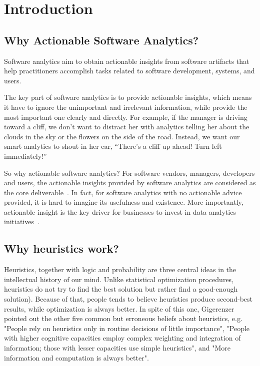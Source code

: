 \documentclass[table, xcdraw, sigconf,review, anonymous]{acmart}
\begin{document}
% 
\section{Introduction}

    \subsection{Why Actionable Software Analytics?}
        Software analytics aim to
        obtain actionable insights
        from software artifacts that
        help practitioners accomplish tasks 
        related to software development, systems, 
        and users.
        
        The key part of software analytics is to provide 
        actionable insights, which means it have to 
        ignore the unimportant and irrelevant information, 
        while provide the most important one clearly and directly.
        For example, if the manager is driving toward a cliff, 
        we don’t want to distract her with analytics 
        telling her about the clouds in the sky or 
        the flowers on the side of the road. Instead, 
        we want our smart analytics to shout in her ear, 
        “There’s a cliff up ahead! Turn left immediately!”
        
        So why actionable software analytics? 
        For software vendors, managers, developers and users, 
        the actionable insights provided by software analytics 
        are considered as the core deliverable~\cite{tan2016defining}. 
        In fact, for software analytics with no actionable advice provided, 
        it is hard to imagine its usefulness and existence. 
        More importantly,
        actionable insight is the key driver for businesses 
        to invest in data analytics initiatives~\cite{sawyer2013bi}. 

    \subsection{Why heuristics work?}
        Heuristics, together with logic and probability 
        are three central ideas in the intellectual history of our mind.
        Unlike statistical optimization procedures, 
        heuristics do not try to find the best solution
        but rather find a good-enough solution). 
        Because of that, 
        people tends to believe heuristics produce second-best results, 
        while optimization is always better.
        In spite of this one, Gigerenzer pointed out the other five common but erroneous beliefs about heuristics\cite{gigerenzer2008heuristics}, e.g. "People rely on heuristics only in routine
        decisions of little importance", 
        "People with higher cognitive capacities employ
        complex weighting and integration of
        information; those with lesser capacities use
        simple heuristics", and 
        "More information and computation is always
        better".
        
\end{document}
